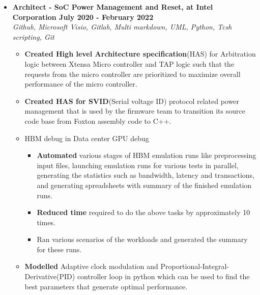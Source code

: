 \documentclass[a4paper,11pt]{article}
\newcommand{\isep}{-2 pt}
\newcommand{\spsep}{-0.75cm}
\begin{document}
\begin{itemize}
	\item \textbf{Architect - SoC Power Management and Reset, at Intel Corporation \hfill July 2020 - February 2022} \\
	\emph{Github, Microsoft Visio, Gitlab,  \hfill Multi markdown, UML, Python, Tcsh scripting, Git} \\[\spsep]
		\begin{itemize} \itemsep \isep
			\item \textbf{Created High level Architecture specification}(HAS) for Arbitration logic between Xtensa Micro controller and TAP logic such that the requests from the micro controller are prioritized to maximize overall performance of the micro controller.
			\item \textbf{Created HAS for SVID}(Serial voltage ID) protocol related power management that is used by the firmware team to transition its source code base from Foxton assembly code to C++.
			\item HBM debug in Data center GPU debug
				\begin{itemize} \itemsep \isep
					\item \textbf{Automated} various stages of HBM emulation runs like preprocessing input files, launching emulation runs for various tests in parallel, generating the statistics such as bandwidth, latency and transactions, and generating spreadsheets with summary of the finished emulation runs.
					\item \textbf{Reduced time} required to do the above tasks by approximately 10 times.
					\item Ran various scenarios of the workloads and generated the summary for these runs.
				\end{itemize}
			\item \textbf{Modelled} Adaptive clock modulation and Proportional-Integral-Derivative(PID) controller loop in python which can be used to find the best parameters that generate optimal performance.
		\end{itemize}
	

\end{itemize}
\end{document}

